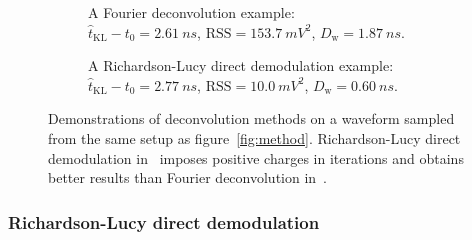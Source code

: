 \begin{figure}[H]
  \begin{subfigure}{0.5\textwidth}
    \centering
    \resizebox{\textwidth}{!}{}
    \caption{\label{fig:fd} A Fourier deconvolution example: \\ $\hat{t}_\mathrm{KL} - t_0=\SI{2.61}{ns}$, $\mathrm{RSS}=\SI{153.7}{mV^2}$, $D_\mathrm{w}=\SI{1.87}{ns}$.}
  \end{subfigure}
  \begin{subfigure}{0.5\textwidth}
    \centering
    \resizebox{\textwidth}{!}{}
    \caption{\label{fig:lucy} A Richardson-Lucy direct demodulation example:\\ $\hat{t}_\mathrm{KL} - t_0=\SI{2.77}{ns}$, $\mathrm{RSS}=\SI{10.0}{mV^2}$, $D_\mathrm{w}=\SI{0.60}{ns}$.}
  \end{subfigure}
  \caption{\label{fig:deconv}Demonstrations of deconvolution methods on a waveform sampled from the same setup as figure~\ref{fig:method}. Richardson-Lucy direct demodulation in~ imposes positive charges in iterations and obtains better results than Fourier deconvolution in~.}
\end{figure}

\subsubsection{Richardson-Lucy direct demodulation}
\label{sec:lucyddm}

